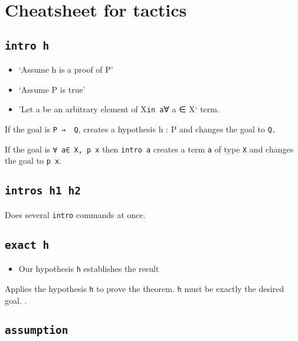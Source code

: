 \hypertarget{cheatsheet-for-tactics}{%
\section{Cheatsheet for tactics}\label{cheatsheet-for-tactics}}

\hypertarget{intro-h}{%
\subsection{\texorpdfstring{\texttt{intro\ h}}{intro h}}\label{intro-h}}

\begin{itemize}
\tightlist
\item
  `Assume h is a proof of P'
\item
  `Assume P is true'
\item
  'Let a be an arbitrary element of X\texttt{in\ a}∀ a ∈ X` term.
\end{itemize}

If the goal is \texttt{P\ →\ \ Q}, creates a hypothesis h : P and
changes the goal to \texttt{Q.}

If the goal is \texttt{∀\ a∈\ X,\ p\ x} then \texttt{intro\ a} creates a
term \texttt{a} of type \texttt{X} and changes the goal to
\texttt{p\ x}.

\hypertarget{intros-h1-h2}{%
\subsection{\texorpdfstring{\texttt{intros\ h1\ h2}}{intros h1 h2}}\label{intros-h1-h2}}

Does several \texttt{intro} commands at once.

\hypertarget{exact-h}{%
\subsection{\texorpdfstring{\texttt{exact\ h}}{exact h}}\label{exact-h}}

\begin{itemize}
\tightlist
\item
  Our hypothesis \texttt{h} establishes the result
\end{itemize}

Applies the hypothesis \texttt{h} to prove the theorem. \texttt{h} must
be exactly the desired goal. .

\hypertarget{assumption}{%
\subsection{\texorpdfstring{\texttt{assumption}}{assumption}}\label{assumption}}

